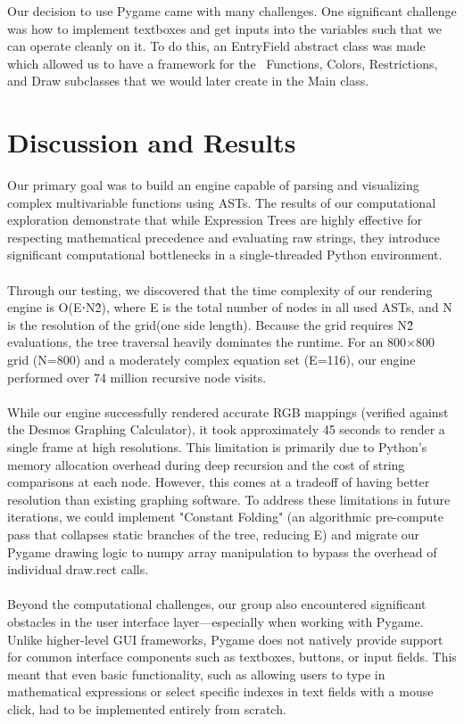 \documentclass{article}
\begin{document}
Our decision to use Pygame came with many challenges. One significant challenge was how to implement textboxes and get inputs into the variables such that we can operate cleanly on it. To do this, an EntryField abstract class was made which allowed us to have a framework for the  Functions, Colors, Restrictions, and Draw subclasses that we would later create in the Main class.

\section{\textbf{Discussion and Results}}
Our primary goal was to build an engine capable of parsing and visualizing complex multivariable functions using ASTs. The results of our computational exploration demonstrate that while Expression Trees are highly effective for respecting mathematical precedence and evaluating raw strings, they introduce significant computational bottlenecks in a single-threaded Python environment.
\\\\Through our testing, we discovered that the time complexity of our rendering engine is O(E⋅N\^2), where E is the total number of nodes in all used ASTs, and N is the resolution of the grid(one side length). Because the grid requires N\^2 evaluations, the tree traversal heavily dominates the runtime. For an 800×800 grid (N=800) and a moderately complex equation set (E=116), our engine performed over 74 million recursive node visits.
\\\\While our engine successfully rendered accurate RGB mappings (verified against the Desmos Graphing Calculator), it took approximately 45 seconds to render a single frame at high resolutions. This limitation is primarily due to Python's memory allocation overhead during deep recursion and the cost of string comparisons at each node. However, this comes at a tradeoff of having better resolution than existing graphing software. To address these limitations in future iterations, we could implement "Constant Folding" (an algorithmic pre-compute pass that collapses static branches of the tree, reducing E) and migrate our Pygame drawing logic to numpy array manipulation to bypass the overhead of individual draw.rect calls. 
\\\\Beyond the computational challenges, our group also encountered significant obstacles in the user interface layer—especially when working with Pygame. Unlike higher-level GUI frameworks, Pygame does not natively provide support for common interface components such as textboxes, buttons, or input fields. This meant that even basic functionality, such as allowing users to type in mathematical expressions or select specific indexes in text fields with a mouse click, had to be implemented entirely from scratch.
\end{document}
